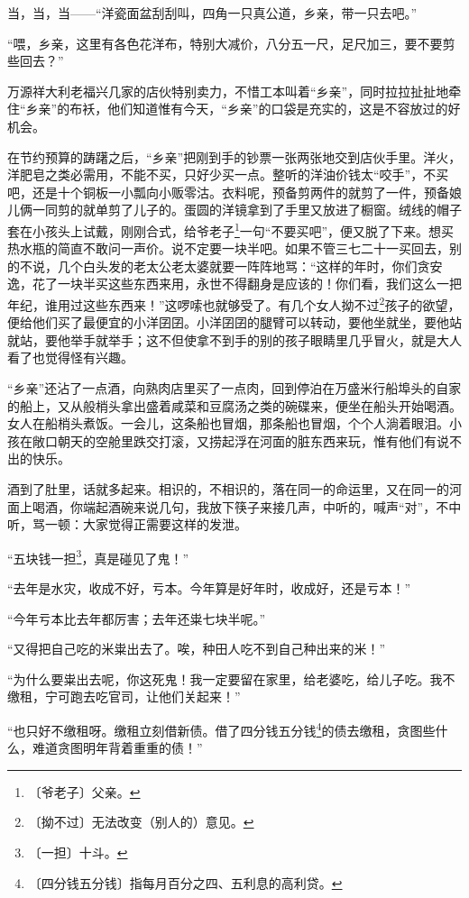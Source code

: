 \documentclass[12pt,UTF-8,openany]{ctexbook}
\begin{document}
\begin{normalsize}
    当，当，当——“洋瓷面盆刮刮叫，四角一只真公道，乡亲，带一只去吧。”
    
    “喂，乡亲，这里有各色花洋布，特别大减价，八分五一尺，足尺加三，要不要剪些回去？”
    
    万源祥大利老福兴几家的店伙特别卖力，不惜工本叫着“乡亲”，同时拉拉扯扯地牵住“乡亲”的布袄，他们知道惟有今天，“乡亲”的口袋是充实的，这是不容放过的好机会。
    
    在节约预算的踌躇之后，“乡亲”把刚到手的钞票一张两张地交到店伙手里。洋火，洋肥皂之类必需用，不能不买，只好少买一点。整听的洋油价钱太“咬手”，不买吧，还是十个铜板一小瓢向小贩零沽。衣料呢，预备剪两件的就剪了一件，预备娘儿俩一同剪的就单剪了儿子的。蛋圆的洋镜拿到了手里又放进了橱窗。绒线的帽子套在小孩头上试戴，刚刚合式，给爷老子\footnote{〔爷老子〕父亲。}一句“不要买吧”，便又脱了下来。想买热水瓶的简直不敢问一声价。说不定要一块半吧。如果不管三七二十一买回去，别的不说，几个白头发的老太公老太婆就要一阵阵地骂：“这样的年时，你们贪安逸，花了一块半买这些东西来用，永世不得翻身是应该的！你们看，我们这么一把年纪，谁用过这些东西来！”这啰嗦也就够受了。有几个女人拗不过\footnote{〔拗不过〕无法改变（别人的）意见。}孩子的欲望，便给他们买了最便宜的小洋囝囝。小洋囝囝的腿臂可以转动，要他坐就坐，要他站就站，要他举手就举手；这不但使拿不到手的别的孩子眼睛里几乎冒火，就是大人看了也觉得怪有兴趣。
    
    “乡亲”还沾了一点酒，向熟肉店里买了一点肉，回到停泊在万盛米行船埠头的自家的船上，又从般梢头拿出盛着咸菜和豆腐汤之类的碗碟来，便坐在船头开始喝酒。女人在船梢头煮饭。一会儿，这条船也冒烟，那条船也冒烟，个个人淌着眼泪。小孩在敞口朝天的空舱里跌交打滚，又捞起浮在河面的脏东西来玩，惟有他们有说不出的快乐。
    
    酒到了肚里，话就多起来。相识的，不相识的，落在同一的命运里，又在同一的河面上喝酒，你端起酒碗来说几句，我放下筷子来接几声，中听的，喊声“对”，不中听，骂一顿：大家觉得正需要这样的发泄。
    
    “五块钱一担\footnote{〔一担〕十斗。}，真是碰见了鬼！”
    
    “去年是水灾，收成不好，亏本。今年算是好年时，收成好，还是亏本！”
    
    “今年亏本比去年都厉害；去年还粜七块半呢。”
    
    “又得把自己吃的米粜出去了。唉，种田人吃不到自己种出来的米！”
    
    “为什么要粜出去呢，你这死鬼！我一定要留在家里，给老婆吃，给儿子吃。我不缴租，宁可跑去吃官司，让他们关起来！”
    
    “也只好不缴租呀。缴租立刻借新债。借了四分钱五分钱\footnote{〔四分钱五分钱〕指每月百分之四、五利息的高利贷。}的债去缴租，贪图些什么，难道贪图明年背着重重的债！” 
    

\end{normalsize}
\end{document}
